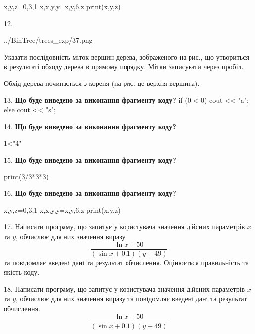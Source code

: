 \documentclass[11pt]{article}
\begin{document}
x,y,z=0,3,1
x,x,y,y=x,y,6,z
print(x,y,z)
\par\vspace{5mm}

12. 

\begin{center}
	{../BinTree/trees_exp/37.png}
\end{center}
Указати послідовність міток вершин дерева, зображеного на рис., що утвориться в результаті обходу дерева в прямому порядку. Мітки записувати через пробіл.\par Обхід дерева починається з кореня (на рис. це верхня вершина).
\par\vspace{5mm}

13. \textbf{Що буде виведено за виконання фрагменту коду?}
if (0 < 0)
    cout << "a";
else
    cout << "s";

\par\vspace{5mm}

14. \textbf{Що буде виведено за виконання фрагменту коду?}

1<"4"
\par\vspace{5mm}

15. \textbf{Що буде виведено за виконання фрагменту коду?}

print(3/3*3*3)
\par\vspace{5mm}

16. \textbf{Що буде виведено за виконання фрагменту коду?}

x,y,z=0,3,1
x,x,y,y=x,y,6,z
print(x,y,z)
\par\vspace{5mm}

17. 
Написати програму, що запитує у користувача значення дійсних параметрів $x$ та $y$, обчислює для них значення виразу 
$$\frac{\ln x + 50}{(\sin x + 0.1) (y + 49)}$$ 
та повiдомляє введенi данi та результат обчислення.
 Оцінюється правильність та якість коду.

\par\vspace{5mm}

18. 
Написати програму, що запитує у користувача значення дійсних параметрів $x$ та $y$, обчислює для них значення виразу та повiдомляє введенi данi та результат обчислення.
$$\frac{\ln x + 50}{(\sin x + 0.1) (y + 49)}$$ 
\end{document}
